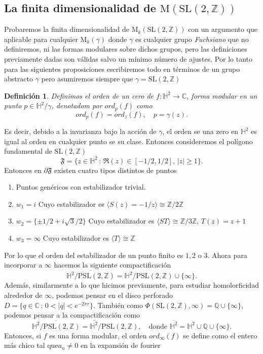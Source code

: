 \documentclass[letterpaper]{article}
\newtheorem{def.}{Definici\'on}[section]
\newcommand{\zah}{\ensuremath{ \mathbb Z }}
\newcommand{\rac}{\ensuremath{ \mathbb Q }}
\newcommand{\ga}{\ensuremath{\gamma}}
\newcommand{\co}{\ensuremath{\mathbb C }}
\newcommand{\pslz}{\ensuremath{\mathrm{PSL}(2,\mathbb Z) }}
\newcommand{\hd}{\ensuremath{\mathbb H^2}}
\newcommand{\slz}{\ensuremath{\mathrm{SL}(2,\mathbb Z) }}
\newcommand{\mdlr}{\ensuremath{\mathrm{M}}}
\begin{document}
\subsection{La finita dimensionalidad de \(\mdlr(\slz)\)}
\label{sec:org9e4cf29}
\noindent Probaremos la finita dimensionalidad de \(\mdlr_{k}(\slz)\) con un argumento que aplicable para cualquier \(\mdlr_{k}(\ga)\) donde \(\ga\) es cualquier grupo \emph{Fuchsiano} que no definiremos, ni las formas modulares sobre dichos grupos, pero las definiciones previamente dadas son válidas salvo un mínimo número de ajustes. Por lo tanto para las siguientes proposiciones escribiremos todo en términos de un grupo abstracto \(\ga\) pero asumiremos siempre que \(\ga=\slz\)
\begin{def.}
Definimos el orden de un cero de \(f:\hd\rightarrow\co\), forma modular en un punto \(p\in\hd/\ga\), denotadom por \(ord_p(f)\) como
\[
 ord_p(f)=ord_z(f),\quad p=\ga(z).
\]
\end{def.}
Es decir, debido a la invarianza bajo la acción de \(\ga\), el orden se una zero en \(\hd\) es igual al orden en cualquier punto se su clase.
Entonces consideremos el polígono fundamental de \(\slz\)
\[
    \mathfrak{F}=\{z\in\hd\,:\, \Re(z)\in[-1/2,1/2],\,|z|\geq 1\}.
\]
\noindent Entonces en \(\partial\mathfrak{F}\) existen cuatro tipos distintos de puntos
\begin{enumerate}
\item Puntos genéricos con estabilizador trivial.
\item \(w_1=i\) Cuyo estabilizador es \(\langle S(z)=-1/z \rangle\cong\zah/2\zah\)
\item \(w_2=\{\pm 1/2+i\sqrt{3}/2\}\) Cuyo estabilizador es  \(\langle ST \rangle\cong\zah/3\zah\), \(T(z)=z+1\)
\item \(w_3=\infty\) Cuyo estabilizador es \(\langle T\rangle\cong\zah\)
\end{enumerate}
Por lo que el orden del estabilizador de un punto finito es \(1,2\) o \(3\). Ahora para incorporar a \(\infty\) hacemos la siguiente compactificación
\[
    \overline{\hd/\pslz}=\hd/\pslz\cup\{\infty\}.
\]
Además, similarmente a lo que hicimos previamente, para estudiar homolorficidad alrededor de \(\infty\), podemos pensar en el disco perforado \(D=\{q\in\co\,:\,0<|q|<e^{-2\pi r}\}\). También como \(\Phi(\slz,\infty)=\rac\cup\{\infty\}\), podemos pensar a la compactificación como
\[
    \overline{\hd/\pslz}=\overline{\hd}/\pslz,\quad\text{donde }\overline{\hd}=\hd\cup\rac\cup\{\infty\}.
\]
Entonces, si \(f\) es una forma modular, el orden \(ord_{\infty}(f)\) se define como el entero más chico tal que\(a_n\neq0\) en la expansión de fourier
\end{document}
